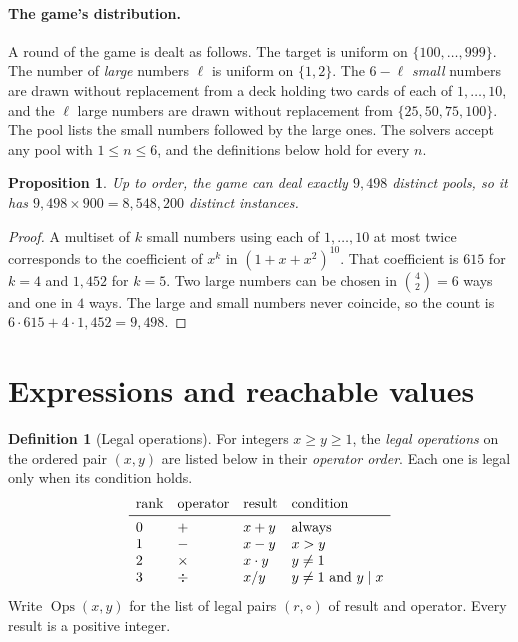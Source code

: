 \documentclass[11pt,a4paper]{article}
\newtheorem{proposition}[theorem]{Proposition}
\theoremstyle{definition}
\newtheorem{definition}[theorem]{Definition}
\theoremstyle{remark}
\newcommand{\Ops}{\operatorname{Ops}}
\begin{document}
\paragraph{The game's distribution.}
A round of the game is dealt as follows. The target is uniform on $\{100, \dots, 999\}$. The number of
\emph{large} numbers $\ell$ is uniform on $\{1, 2\}$. The $6 - \ell$ \emph{small} numbers are drawn without
replacement from a deck holding two cards of each of $1, \dots, 10$, and the $\ell$ large numbers are drawn
without replacement from $\{25, 50, 75, 100\}$. The pool lists the small numbers followed by the large ones.
The solvers accept any pool with $1 \le n \le 6$, and the definitions below hold for every $n$.

\begin{proposition}\label{prop:pools}
Up to order, the game can deal exactly $9{,}498$ distinct pools, so it has $9{,}498 \times 900 = 8{,}548{,}200$
distinct instances.
\end{proposition}

\begin{proof}
A multiset of $k$ small numbers using each of $1, \dots, 10$ at most twice corresponds to the coefficient of
$x^k$ in $(1 + x + x^2)^{10}$. That coefficient is $615$ for $k = 4$ and $1{,}452$ for $k = 5$. Two large numbers
can be chosen in $\binom{4}{2} = 6$ ways and one in $4$ ways. The large and small numbers never coincide,
so the count is $6 \cdot 615 + 4 \cdot 1{,}452 = 9{,}498$.
\end{proof}

\section{Expressions and reachable values}\label{sec:expressions}

\begin{definition}[Legal operations]\label{def:ops}
For integers $x \ge y \ge 1$, the \emph{legal operations} on the ordered pair $(x, y)$ are listed below in
their \emph{operator order}. Each one is legal only when its condition holds.
\[
\begin{array}{llll}
\text{rank} & \text{operator} & \text{result} & \text{condition} \\ \midrule
0 & + & x + y & \text{always} \\
1 & - & x - y & x > y \\
2 & \times & x \cdot y & y \ne 1 \\
3 & \div & x / y & y \ne 1 \text{ and } y \mid x
\end{array}
\]
Write $\Ops(x, y)$ for the list of legal pairs $(r, \circ)$ of result and operator. Every result is a positive
integer.
\end{definition}
\end{document}
